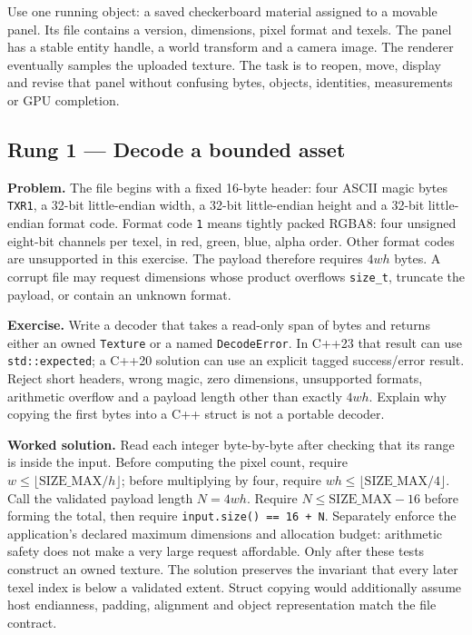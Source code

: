 Use one running object: a saved checkerboard material assigned to a movable panel. Its file contains a version, dimensions, pixel format and texels. The panel has a stable entity handle, a world transform and a camera image. The renderer eventually samples the uploaded texture. The task is to reopen, move, display and revise that panel without confusing bytes, objects, identities, measurements or GPU completion.

\subsection{Rung 1 --- Decode a bounded asset}\label{02-foundations-ii-ch038-rung-1-decode-a-bounded-asset}

\textbf{Problem.} The file begins with a fixed 16-byte header: four ASCII magic bytes \texttt{TXR1}, a 32-bit little-endian width, a 32-bit little-endian height and a 32-bit little-endian format code. Format code \texttt{1} means tightly packed RGBA8: four unsigned eight-bit channels per texel, in red, green, blue, alpha order. Other format codes are unsupported in this exercise. The payload therefore requires \(4wh\) bytes. A corrupt file may request dimensions whose product overflows \texttt{size\_t}, truncate the payload, or contain an unknown format.

\textbf{Exercise.} Write a decoder that takes a read-only span of bytes and returns either an owned \texttt{Texture} or a named \texttt{DecodeError}. In C++23 that result can use \texttt{std::expected}; a C++20 solution can use an explicit tagged success/error result. Reject short headers, wrong magic, zero dimensions, unsupported formats, arithmetic overflow and a payload length other than exactly \(4wh\). Explain why copying the first bytes into a C++ struct is not a portable decoder.

\textbf{Worked solution.} Read each integer byte-by-byte after checking that its range is inside the input. Before computing the pixel count, require \(w \le \lfloor\text{SIZE\_MAX}/h\rfloor\); before multiplying by four, require \(wh \le \lfloor\text{SIZE\_MAX}/4\rfloor\). Call the validated payload length \(N=4wh\). Require \(N\leq\mathrm{SIZE\_MAX}-16\) before forming the total, then require \texttt{input.size()\ ==\ 16\ +\ N}. Separately enforce the application's declared maximum dimensions and allocation budget: arithmetic safety does not make a very large request affordable. Only after these tests construct an owned texture. The solution preserves the invariant that every later texel index is below a validated extent. Struct copying would additionally assume host endianness, padding, alignment and object representation match the file contract.


